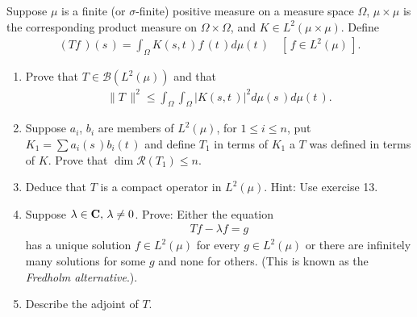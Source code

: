 { \CMUCS Suppose $\mu$ is a finite (or $\sigma$-finite) positive measure on a measure space $\Omega$, $\mu\times\mu$ is the corresponding product measure on $\Omega\times\Omega$, and $K\in L^2(\mu\times\mu)$. Define 
\begin{align*}
(Tf\,)(s\,)=\int_\Omega K(s,t\,) f\,(t\,) d\mu(t\,)\quad [\,f\in L^2(\mu)\,].
\end{align*}
\begin{enumerate}
\renewcommand{\labelenumi}{(\alph{enumi})}
\item Prove that $T\in \mathscr{B}(L^2(\mu))$ and that 
\begin{align*}
\| T\, \|^2 \leq \int_\Omega\int_\Omega \lvert K (s,t\,)\rvert ^2 d\mu (s\,) d\mu(t\,).
\end{align*}
\item Suppose $a_i$, $b_i$ are members of $L^2(\mu)$, for $1\leq i\leq n$, put $K_1=\sum a_i(s\,)b_i(t\,)$ and define $T_1$ in terms of $K_1$ a $T$ was defined in terms of $K$. Prove that $\dim \mathscr{R}(T_1)\leq n$.
\item Deduce that $T$ is a compact operator in $L^2(\mu)$. Hint: Use exercise 13.
\item Suppose $\lambda\in {\mathbf C},\, \lambda\neq 0$. Prove: Either the equation 
\begin{align*}Tf-\lambda f=g\end{align*}
has a unique solution $f\in L^2(\mu)$ for every $g\in L^2(\mu)$ or there are infinitely many solutions for some $g$ and none for others. (This is known as the \textsl{Fredholm alternative}.).
\item Describe the adjoint of $T$.
 \end{enumerate}
}
